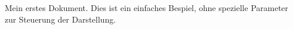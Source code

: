 \documentclass{article}
\begin{document}
    Mein erstes Dokument. Dies ist ein einfaches Bespiel,
    ohne spezielle Parameter zur Steuerung der Darstellung.
\end{document}
